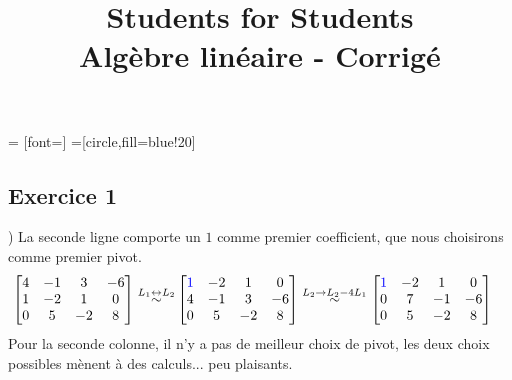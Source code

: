\documentclass{article}
\title{Students for Students \\Algèbre linéaire - Corrigé}
\author{}
\date{}
\begin{document}
 = [font=\scriptsize]  
=[circle,fill=blue!20]

\maketitle

\subsection*{Exercice 1}
) La seconde ligne comporte un $1$ comme premier coefficient, que nous choisirons comme premier pivot.
\begin{align*}
    \begin{bmatrix}
    4 & -1 & 3 & -6\\
    1 & -2 & 1 & 0\\
    0 & 5 & -2 & 8
    \end{bmatrix} 
    \overset{L_1 \leftrightarrow L_2}{\sim}
    &\begin{bmatrix}
    \color{blue}1 & -2 & 1 & 0\\
    4 & -1 & 3 & -6\\
    0 & 5 & -2 & 8
    \end{bmatrix}
    \overset{L_2 \to L_2 - 4L_1}{\sim}
    \begin{bmatrix}
    \color{blue}1 & -2 & 1 & 0\\
    0 & 7 & -1 & -6\\
    0 & 5 & -2 & 8
    \end{bmatrix}
\end{align*}
\noindent Pour la seconde colonne, il n'y a pas de meilleur choix de pivot, les deux choix possibles mènent à des calculs... peu plaisants.
\end{document}

